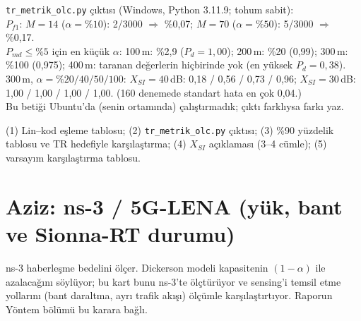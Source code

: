 \documentclass[10.5pt,a4paper]{article}
\begin{document}
\begin{kontrol}
\texttt{tr\_metrik\_olc.py} çıktısı (Windows, Python 3.11.9; tohum sabit):\\
$P_{f1}$: $M=14$ ($\alpha=\%10$): 2/3000 $\Rightarrow$ \%0,07; $M=70$ ($\alpha=\%50$): 5/3000 $\Rightarrow$ \%0,17.\\
$P_{md}\le\%5$ için en küçük $\alpha$: 100\,m: \%2,9 ($P_d=1{,}00$); 200\,m: \%20 (0,99); 300\,m: \%100 (0,975); 400\,m: taranan değerlerin hiçbirinde yok (en yüksek $P_d=0{,}38$).\\
300\,m, $\alpha=\%20/40/50/100$: $X_{SI}=40$\,dB: 0,18 / 0,56 / 0,73 / 0,96; $X_{SI}=30$\,dB: 1,00 / 1,00 / 1,00 / 1,00. (160 denemede standart hata en çok 0,04.)\\
Bu betiği Ubuntu'da (senin ortamında) çalıştırmadık; çıktı farklıysa farkı yaz.
\end{kontrol}

\begin{teslim}
(1) Lin--kod eşleme tablosu; (2) \texttt{tr\_metrik\_olc.py} çıktısı; (3) \%90 yüzdelik tablosu ve TR hedefiyle karşılaştırma; (4) $X_{SI}$ açıklaması (3--4 cümle); (5) varsayım karşılaştırma tablosu.
\end{teslim}

\clearpage
\section*{Aziz: ns-3 / 5G-LENA (yük, bant ve Sionna-RT durumu)}
\begin{neden}
ns-3 haberleşme bedelini ölçer. Dickerson modeli kapasitenin $(1-\alpha)$ ile azalacağını söylüyor; bu kart bunu ns-3'te ölçtürüyor ve sensing'i temsil etme yollarını (bant daraltma, ayrı trafik akışı) ölçümle karşılaştırtıyor. Raporun Yöntem bölümü bu karara bağlı.
\end{neden}
\end{document}
